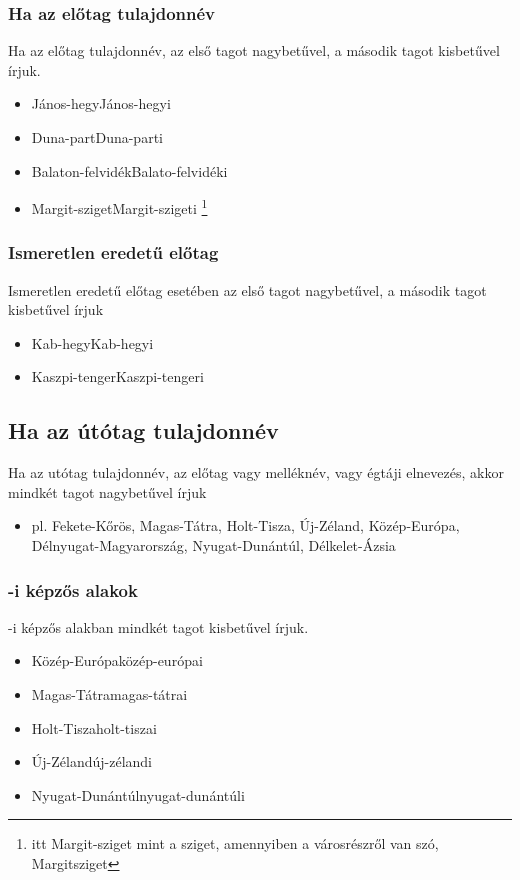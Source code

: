 \documentclass{article}
\begin{document}
\subsubsection{Ha az előtag tulajdonnév}
Ha az előtag tulajdonnév, az első tagot nagybetűvel, a második tagot kisbetűvel írjuk.
\begin{itemize}
    \item János-hegy\textrightarrow János-hegyi
    \item Duna-part\textrightarrow Duna-parti
    \item Balaton-felvidék\textrightarrow Balato-felvidéki
    \item Margit-sziget\textrightarrow Margit-szigeti \footnote{itt Margit-sziget mint a sziget, amennyiben a városrészről van szó, Margitsziget}
\end{itemize}

\subsubsection{Ismeretlen eredetű előtag}
Ismeretlen eredetű előtag esetében az első tagot nagybetűvel, a második tagot kisbetűvel írjuk
\begin{itemize}
    \item Kab-hegy\textrightarrow Kab-hegyi
    \item Kaszpi-tenger\textrightarrow Kaszpi-tengeri
\end{itemize}

\subsection{Ha az útótag tulajdonnév}
Ha az utótag tulajdonnév, az előtag vagy melléknév, vagy égtáji elnevezés, akkor mindkét tagot nagybetűvel írjuk
\begin{itemize}
    \item pl. Fekete-Kőrös, Magas-Tátra, Holt-Tisza, Új-Zéland, Közép-Európa, Délnyugat-Magyarország, Nyugat-Dunántúl, Délkelet-Ázsia
\end{itemize}

\subsubsection{-i képzős alakok}
-i képzős alakban mindkét tagot kisbetűvel írjuk.
\begin{itemize}
    \item Közép-Európa\textrightarrow közép-európai
    \item Magas-Tátra\textrightarrow magas-tátrai
    \item Holt-Tisza\textrightarrow holt-tiszai
    \item Új-Zéland\textrightarrow új-zélandi
    \item Nyugat-Dunántúl\textrightarrow nyugat-dunántúli
\end{itemize}
\end{document}
